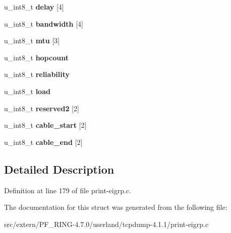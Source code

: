 \begin{DoxyCompactItemize}
\item 
\hypertarget{structeigrp__tlv__at__ext__t_aa76dd8a68ab91839e60d8d2ebb29c1d5}{
u\_\-int8\_\-t {\bfseries delay} \mbox{[}4\mbox{]}}
\label{structeigrp__tlv__at__ext__t_aa76dd8a68ab91839e60d8d2ebb29c1d5}

\item 
\hypertarget{structeigrp__tlv__at__ext__t_a8be9713c72b750354d8f6242ec936267}{
u\_\-int8\_\-t {\bfseries bandwidth} \mbox{[}4\mbox{]}}
\label{structeigrp__tlv__at__ext__t_a8be9713c72b750354d8f6242ec936267}

\item 
\hypertarget{structeigrp__tlv__at__ext__t_af948b6789641b77eb6f61a58c1b2f57a}{
u\_\-int8\_\-t {\bfseries mtu} \mbox{[}3\mbox{]}}
\label{structeigrp__tlv__at__ext__t_af948b6789641b77eb6f61a58c1b2f57a}

\item 
\hypertarget{structeigrp__tlv__at__ext__t_a59f09fdda046b932b5473522ba33f7ed}{
u\_\-int8\_\-t {\bfseries hopcount}}
\label{structeigrp__tlv__at__ext__t_a59f09fdda046b932b5473522ba33f7ed}

\item 
\hypertarget{structeigrp__tlv__at__ext__t_ac7887efac5b2e768d2a8c3d09a644cdb}{
u\_\-int8\_\-t {\bfseries reliability}}
\label{structeigrp__tlv__at__ext__t_ac7887efac5b2e768d2a8c3d09a644cdb}

\item 
\hypertarget{structeigrp__tlv__at__ext__t_a9a578085d263abfad4e537cdcbe050ca}{
u\_\-int8\_\-t {\bfseries load}}
\label{structeigrp__tlv__at__ext__t_a9a578085d263abfad4e537cdcbe050ca}

\item 
\hypertarget{structeigrp__tlv__at__ext__t_a0b7e7a9a71092bd40798a4a31d063057}{
u\_\-int8\_\-t {\bfseries reserved2} \mbox{[}2\mbox{]}}
\label{structeigrp__tlv__at__ext__t_a0b7e7a9a71092bd40798a4a31d063057}

\item 
\hypertarget{structeigrp__tlv__at__ext__t_a65cec102412e6204f973215c5190927e}{
u\_\-int8\_\-t {\bfseries cable\_\-start} \mbox{[}2\mbox{]}}
\label{structeigrp__tlv__at__ext__t_a65cec102412e6204f973215c5190927e}

\item 
\hypertarget{structeigrp__tlv__at__ext__t_a2c2595fb4421223c7d44f2a8456aab5e}{
u\_\-int8\_\-t {\bfseries cable\_\-end} \mbox{[}2\mbox{]}}
\label{structeigrp__tlv__at__ext__t_a2c2595fb4421223c7d44f2a8456aab5e}

\end{DoxyCompactItemize}


\subsection{Detailed Description}


Definition at line 179 of file print-\/eigrp.c.



The documentation for this struct was generated from the following file:\begin{DoxyCompactItemize}
\item 
src/extern/PF\_\-RING-\/4.7.0/userland/tcpdump-\/4.1.1/print-\/eigrp.c\end{DoxyCompactItemize}

